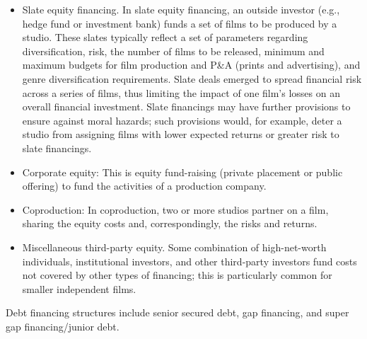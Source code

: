 \documentclass[11pt]{article}
\begin{document}
\begin{itemize}
  \item Slate equity financing. In slate equity financing, an outside investor (e.g., hedge fund or investment bank) funds a set of films to be produced by a studio. These slates typically reflect a set of parameters regarding diversification, risk, the number of films to be released, minimum and maximum budgets for film production and P\&A (prints and advertising), and genre diversification requirements. Slate deals emerged to spread financial risk across a series of films, thus limiting the impact of one film's losses on an overall financial investment. Slate financings may have further provisions to ensure against moral hazards; such provisions would, for example, deter a studio from assigning films with lower expected returns or greater risk to slate financings.
  \item Corporate equity: This is equity fund-raising (private placement or public offering) to fund the activities of a production company.
  \item Coproduction: In coproduction, two or more studios partner on a film, sharing the equity costs and, correspondingly, the risks and returns.
  \item Miscellaneous third-party equity. Some combination of high-net-worth individuals, institutional investors, and other third-party investors fund costs not covered by other types of financing; this is particularly common for smaller independent films.
\end{itemize}

Debt financing structures include senior secured debt, gap financing, and super gap financing/junior debt.
\end{document}
